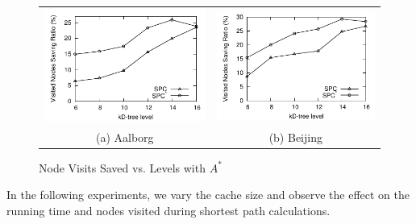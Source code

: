 \begin{figure}[htb]
\center
  \begin{tabular}{@{}c@{ }c@{}}
     \includegraphics[width=0.5\columnwidth]{figures/split_diffnodes_aal_server_astar.pdf}
     &
     \includegraphics[width=0.5\columnwidth]{figures/split_diffnodes_bei_server_astar.pdf}
      \\
     (a) Aalborg & (b)  Beijing
     \end{tabular}
\caption{Node Visits Saved vs. Levels  with $A^*$}
\label{fig:levelVsNodesvisited}
\end{figure}






%
In the following experiments, we vary the cache size and observe the effect on the running time and nodes visited during shortest path calculations.







